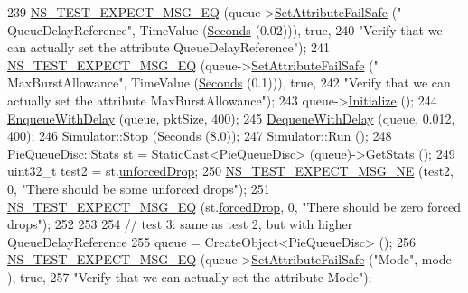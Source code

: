 \begin{DoxyCode}
239   \hyperlink{group__testing_ga7304ba46a28d8cf08dfdfd6499cf7068}{NS\_TEST\_EXPECT\_MSG\_EQ} (queue->\hyperlink{classns3_1_1ObjectBase_aa7d333004e970f925a4ed5df275541b5}{SetAttributeFailSafe} (\textcolor{stringliteral}{"
      QueueDelayReference"}, TimeValue (\hyperlink{group__timecivil_ga33c34b816f8ff6628e33d5c8e9713b9e}{Seconds} (0.02))), \textcolor{keyword}{true},
240                          \textcolor{stringliteral}{"Verify that we can actually set the attribute QueueDelayReference"});
241   \hyperlink{group__testing_ga7304ba46a28d8cf08dfdfd6499cf7068}{NS\_TEST\_EXPECT\_MSG\_EQ} (queue->\hyperlink{classns3_1_1ObjectBase_aa7d333004e970f925a4ed5df275541b5}{SetAttributeFailSafe} (\textcolor{stringliteral}{"
      MaxBurstAllowance"}, TimeValue (\hyperlink{group__timecivil_ga33c34b816f8ff6628e33d5c8e9713b9e}{Seconds} (0.1))), \textcolor{keyword}{true},
242                          \textcolor{stringliteral}{"Verify that we can actually set the attribute MaxBurstAllowance"});
243   queue->\hyperlink{classns3_1_1Object_af4411cb29971772fcd09203474a95078}{Initialize} ();
244   \hyperlink{classPieQueueDiscTestCase_a6d837dbfe3af8f4a7a1ca4e6ecbbf54e}{EnqueueWithDelay} (queue, pktSize, 400);
245   \hyperlink{classPieQueueDiscTestCase_ac95d22c3ac6ef3a873d70a663fd964e3}{DequeueWithDelay} (queue, 0.012, 400);
246   Simulator::Stop (\hyperlink{group__timecivil_ga33c34b816f8ff6628e33d5c8e9713b9e}{Seconds} (8.0));
247   Simulator::Run ();
248   \hyperlink{structns3_1_1PieQueueDisc_1_1Stats}{PieQueueDisc::Stats} st = StaticCast<PieQueueDisc> (queue)->GetStats ();
249   uint32\_t test2 = st.\hyperlink{structns3_1_1PieQueueDisc_1_1Stats_afe4c9f6e4c910cf47d475ff5d29d5bb0}{unforcedDrop};
250   \hyperlink{group__testing_ga6d4b162d26b8a930115b97dd5f3d9ed9}{NS\_TEST\_EXPECT\_MSG\_NE} (test2, 0, \textcolor{stringliteral}{"There should be some unforced drops"});
251   \hyperlink{group__testing_ga7304ba46a28d8cf08dfdfd6499cf7068}{NS\_TEST\_EXPECT\_MSG\_EQ} (st.\hyperlink{structns3_1_1PieQueueDisc_1_1Stats_a40eea66d9bc2ce766df9390776eb88a9}{forcedDrop}, 0, \textcolor{stringliteral}{"There should be zero forced
       drops"});
252 
253 
254   \textcolor{comment}{// test 3: same as test 2, but with higher QueueDelayReference}
255   queue = CreateObject<PieQueueDisc> ();
256   \hyperlink{group__testing_ga7304ba46a28d8cf08dfdfd6499cf7068}{NS\_TEST\_EXPECT\_MSG\_EQ} (queue->\hyperlink{classns3_1_1ObjectBase_aa7d333004e970f925a4ed5df275541b5}{SetAttributeFailSafe} (\textcolor{stringliteral}{"Mode"}, mode
      ), \textcolor{keyword}{true},
257                          \textcolor{stringliteral}{"Verify that we can actually set the attribute Mode"});

\end{DoxyCode}
